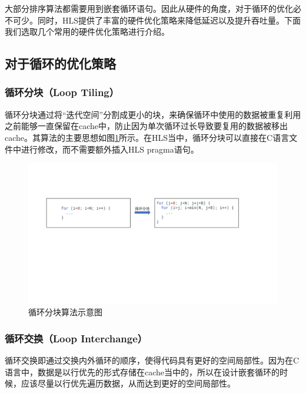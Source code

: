 大部分排序算法都需要用到嵌套循环语句。因此从硬件的角度，对于循环的优化必不可少。同时，HLS提供了丰富的硬件优化策略来降低延迟以及提升吞吐量。下面我们选取几个常用的硬件优化策略进行介绍。

\subsection{对于循环的优化策略}
\subsubsection{循环分块（Loop Tiling）}

循环分块通过将“迭代空间”分割成更小的块，来确保循环中使用的数据被重复利用之前能够一直保留在cache中，防止因为单次循环过长导致要复用的数据被移出cache。其算法的主要思想如图\ref{fig:loop_tiling}所示。在HLS当中，循环分块可以直接在C语言文件中进行修改，而不需要额外插入HLS pragma语句。

\begin{figure}[htbp]
    \centering
    \includegraphics[width=\linewidth]{figures/loop tiling.pdf}
    \caption{循环分块算法示意图}
    \label{fig:loop_tiling}
\end{figure}


\subsubsection{循环交换（Loop Interchange）}

循环交换即通过交换内外循环的顺序，使得代码具有更好的空间局部性。因为在C语言中，数据是以行优先的形式存储在cache当中的，所以在设计嵌套循环的时候，应该尽量以行优先遍历数据，从而达到更好的空间局部性。

